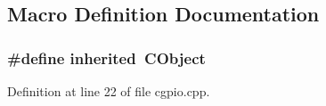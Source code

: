 \subsection{Macro Definition Documentation}
\subsubsection[{inherited}]{\setlength{\rightskip}{0pt plus 5cm}\#define inherited~C\+Object}\label{cgpio_8cpp_a3920e3b7cb0909b941b2409493acf8f1}


Definition at line 22 of file cgpio.\+cpp.

